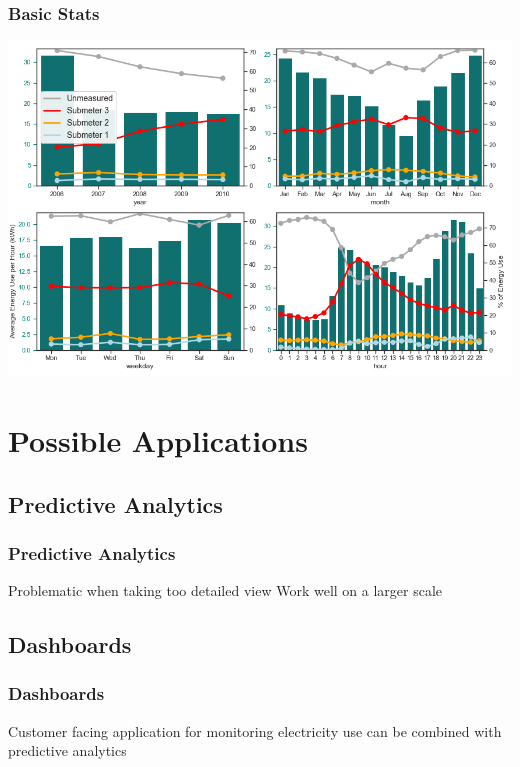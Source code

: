 \documentclass[10pt]{beamer}
\begin{document}
\begin{frame}
\frametitle{Basic Stats}

{
    \centering
    \includegraphics[width=\textwidth,height=\textheight,keepaspectratio]{periodicity.png}
    \par
}

\end{frame}


\section{Possible Applications}

\subsection{Predictive Analytics}

\begin{frame}
\frametitle{Predictive Analytics}

Problematic when taking too detailed view
Work well on a larger scale

\end{frame}

\subsection{Dashboards}

\begin{frame}
\frametitle{Dashboards}

Customer facing application for monitoring electricity use
can be combined with predictive analytics

\end{frame}
\end{document}
